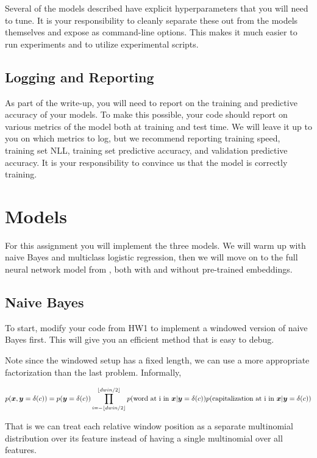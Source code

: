 \documentclass[11pt]{article}
\begin{document}
Several of the models described have explicit hyperparameters that you will 
need to tune. It is your responsibility to cleanly separate these out from 
the models themselves and expose as command-line options. This makes it much 
easier to run experiments and to utilize experimental scripts. 

\subsection{Logging and Reporting}

As part of the write-up, you will need to report on the training and
predictive accuracy of your models. To make this possible, your code
should report on various metrics of the model both at training and
test time. We will leave it up to you on which metrics to log, but we
recommend reporting training speed, training set NLL, training set
predictive accuracy, and validation predictive accuracy. It is your
responsibility to convince us that the model is correctly training.

\section{Models}

For this assignment you will implement the three models. We will warm
up with naive Bayes and multiclass logistic regression, then we will
move on to the full neural network model from
\citet{collobert2011natural}, both with and without pre-trained embeddings.

\subsection{Naive Bayes}

To start, modify your code from HW1
to implement a windowed version of
naive Bayes first. This will give
you an efficient method that is easy
to debug.

Note since the windowed setup has a fixed length, we can use a more appropriate 
factorization than the last problem. Informally,

\[ p(\boldsymbol{x}, \boldsymbol{y}=\delta(c)) = p(\boldsymbol{y}=\delta(c)) \prod_{i=-\lfloor{dwin/2}\rfloor}^{\lfloor{dwin/2}\rfloor}
p(\mathrm{word\ at\ i\ in\ }\boldsymbol{x} | \boldsymbol{y} =\delta(c))
p(\mathrm{capitalization\ at\ i\ in\ }\boldsymbol{x} | \boldsymbol{y} =\delta(c)) \]

That is we can treat each relative window position as a separate
multinomial distribution over its feature instead of having a single
multinomial over all features.
\end{document}
